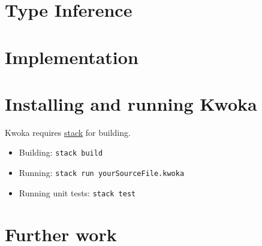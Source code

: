 \documentclass[a4paper]{article}
\begin{document}
\section{Type Inference}
\section{Implementation}
\section{Installing and running Kwoka}
Kwoka requires {\href{https://docs.haskellstack.org/en/stable/README/}{\color{blue}stack}} for building.
\begin{itemize}
    \item Building: \verb+stack build+
    \item Running: \verb+stack run yourSourceFile.kwoka+
    \item Running unit tests: \verb+stack test+
\end{itemize}

\section{Further work}



\end{document}
